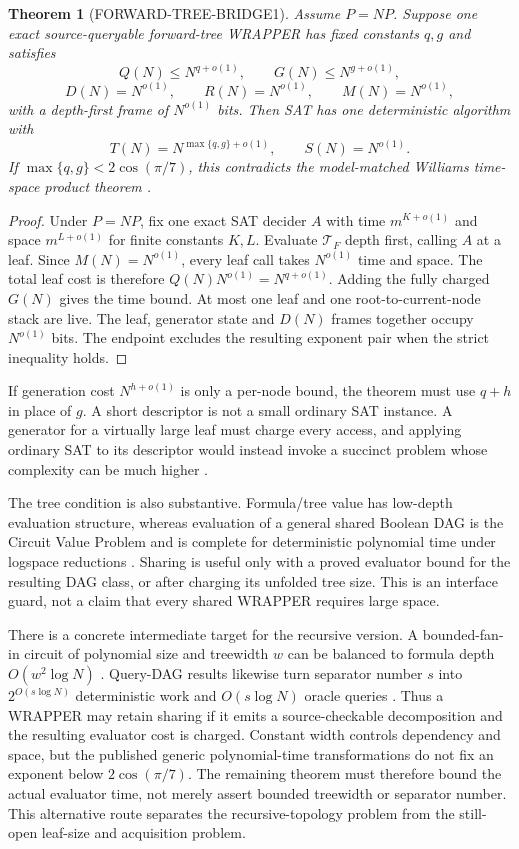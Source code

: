 \documentclass[11pt]{article}
\newtheorem{theorem}{Theorem}
\newcommand{\gammats}{2\cos(\pi/7)}
\begin{document}
\begin{theorem}[FORWARD-TREE-BRIDGE1]
Assume $P=NP$.  Suppose one exact source-queryable forward-tree WRAPPER has
fixed constants $q,g$ and satisfies
\[
 Q(N)\le N^{q+o(1)},\qquad G(N)\le N^{g+o(1)},
\]
\[
 D(N)=N^{o(1)},\qquad R(N)=N^{o(1)},\qquad M(N)=N^{o(1)},
\]
with a depth-first frame of $N^{o(1)}$ bits.  Then SAT has one deterministic
algorithm with
\[
 T(N)=N^{\max\{q,g\}+o(1)},\qquad S(N)=N^{o(1)}.
\]
If $\max\{q,g\}<\gammats$, this contradicts the model-matched Williams
time-space product theorem \cite{williams2010}.
\end{theorem}
\begin{proof}
Under $P=NP$, fix one exact SAT decider $A$ with time $m^{K+o(1)}$ and space
$m^{L+o(1)}$ for finite constants $K,L$.  Evaluate $\mathcal T_F$ depth
first, calling $A$ at a leaf.  Since $M(N)=N^{o(1)}$, every leaf call takes
$N^{o(1)}$ time and space.  The total leaf cost is therefore
$Q(N)N^{o(1)}=N^{q+o(1)}$.  Adding the fully charged $G(N)$ gives the time
bound.  At most one leaf and one root-to-current-node stack are live.  The
leaf, generator state and $D(N)$ frames together occupy $N^{o(1)}$ bits.
The endpoint excludes the resulting exponent pair when the strict inequality
holds.
\end{proof}

If generation cost $N^{h+o(1)}$ is only a per-node bound, the theorem must use
$q+h$ in place of $g$.  A short descriptor is not a small ordinary SAT
instance.  A generator for a virtually large leaf must charge every access,
and applying ordinary SAT to its descriptor would instead invoke a succinct
problem whose complexity can be much higher \cite{py1986}.

The tree condition is also substantive.  Formula/tree value has low-depth
evaluation structure, whereas evaluation of a general shared Boolean DAG is
the Circuit Value Problem and is complete for deterministic polynomial time
under logspace reductions \cite{ladner1975,buss1987}.  Sharing is useful only
with a proved evaluator bound for the resulting DAG class, or after charging
its unfolded tree size.  This is an interface guard, not a claim that every
shared WRAPPER requires large space.

There is a concrete intermediate target for the recursive version.  A
bounded-fan-in circuit of polynomial size and treewidth $w$ can be balanced
to formula depth $O(w^2\log N)$ \cite{jansensarma2010}.  Query-DAG results
likewise turn separator number $s$ into $2^{O(s\log N)}$ deterministic work
and $O(s\log N)$ oracle queries \cite{gharibianrudolph2023}.  Thus a WRAPPER
may retain sharing if it emits a source-checkable decomposition and the
resulting evaluator cost is charged.  Constant width controls dependency and
space, but the published generic polynomial-time transformations do not fix
an exponent below $\gammats$.  The remaining theorem must therefore bound
the actual evaluator time, not merely assert bounded treewidth or separator
number.  This alternative route separates the recursive-topology problem
from the still-open leaf-size and acquisition problem.
\end{document}
